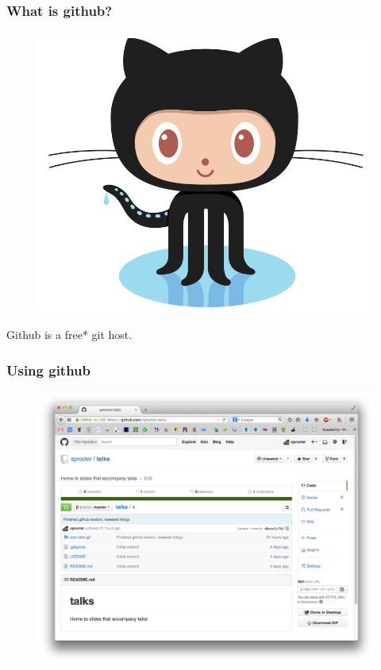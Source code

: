 \documentclass{beamer}
\begin{document}
\begin{frame}
\frametitle{What is github?}

\begin{figure}[!t] \centering
\includegraphics[width=.4\textwidth]{figures/octocat}
\end{figure}

Github is a \alert{free*} git host.

\begin{itemize}
\end{itemize}
\end{frame}

\begin{frame}
\frametitle{Using github}

\begin{figure}[!t] \centering
\includegraphics[width=.8\textwidth]{figures/github-home}
\end{figure}

\end{frame}
\end{document}

